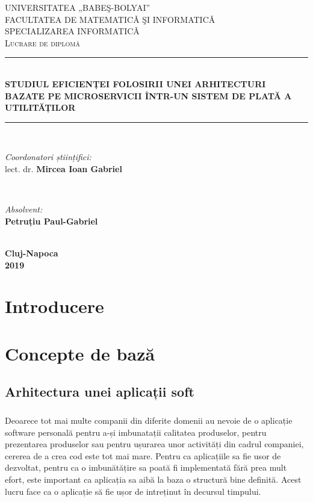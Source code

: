 \documentclass[12pt]{report}
\begin{document}
\begin{titlepage}
 
\newcommand{\HRule}{\rule{\linewidth}{0.5mm}} 
\center
\textsc{UNIVERSITATEA „BABEŞ-BOLYAI” \\
FACULTATEA DE MATEMATICǍ ŞI INFORMATICǍ \\
SPECIALIZAREA INFORMATICǍ}\\[5cm]
\textsc{\large Lucrare de diplomă}\\[0.5cm]

\HRule \\[0.4cm]
{\LARGE  \bfseries STUDIUL EFICIENȚEI FOLOSIRII UNEI ARHITECTURI BAZATE PE MICROSERVICII ÎNTR-UN SISTEM DE PLATĂ A UTILITĂȚILOR}\\[0.4cm]
\HRule \\[1.5cm]
 
\begin{minipage}{0.4\textwidth}
\begin{flushleft} \large
\emph{Coordonatori științifici:}\\
lect. dr. \textbf{Mircea Ioan Gabriel }
\end{flushleft}
\end{minipage}
~
\begin{minipage}{0.4\textwidth}
\begin{flushright} \large
\emph{Absolvent:} \\
\textbf{Petruțiu Paul-Gabriel} 
\end{flushright}
\end{minipage}\\[6cm]
 
{\large \textbf{Cluj-Napoca}}\\[2mm]
{\large \textbf{2019}}
\vfill
\end{titlepage}

\tableofcontents
\cleardoublepage

\chapter{Introducere} 

\chapter{Concepte de bază} 
  \section{Arhitectura unei aplicații soft}
  	\paragraph{}
  	Deoarece tot mai multe companii din diferite domenii au nevoie de o aplicație software personală pentru a-și imbunatații calitatea produselor, pentru prezentarea produselor sau pentru ușurarea unor activități din cadrul companiei, cererea de a crea cod este tot mai mare. Pentru ca aplicațiile sa fie usor de dezvoltat, pentru ca o imbunătățire sa poată fi implementată fără prea mult efort, este important ca aplicația sa aibă la baza o structură bine definită. Acest lucru face ca o aplicație să fie ușor de intreținut în decursul timpului.
\end{document}
